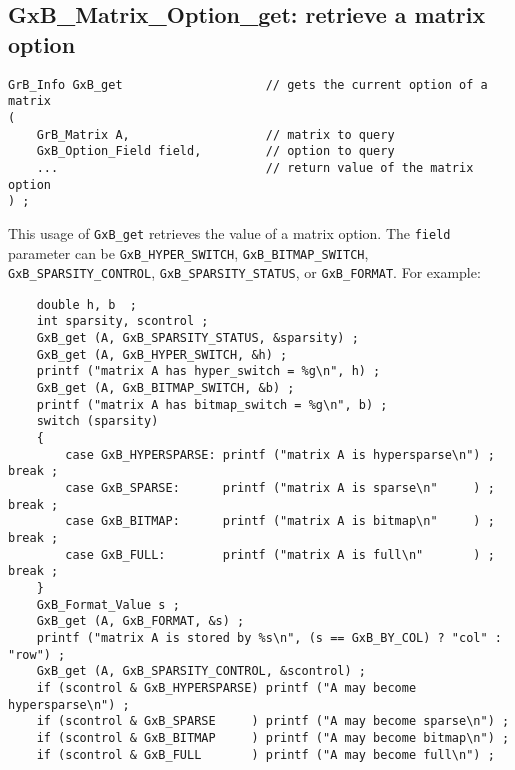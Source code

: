 \documentclass[12pt]{article}
\begin{document}
\subsection{{\sf GxB\_Matrix\_Option\_get:} retrieve a matrix option}

\begin{mdframed}[userdefinedwidth=6in]
{\footnotesize
\begin{verbatim}
GrB_Info GxB_get                    // gets the current option of a matrix
(
    GrB_Matrix A,                   // matrix to query
    GxB_Option_Field field,         // option to query
    ...                             // return value of the matrix option
) ;
\end{verbatim} } \end{mdframed}

This usage of \verb'GxB_get' retrieves the value of a matrix option.  The
\verb'field' parameter can be
\verb'GxB_HYPER_SWITCH',
\verb'GxB_BITMAP_SWITCH',
\verb'GxB_SPARSITY_CONTROL',
\verb'GxB_SPARSITY_STATUS',
or
\verb'GxB_FORMAT'.
For example:

\vspace{-0.1in}
{\footnotesize
\begin{verbatim}
    double h, b  ;
    int sparsity, scontrol ;
    GxB_get (A, GxB_SPARSITY_STATUS, &sparsity) ;
    GxB_get (A, GxB_HYPER_SWITCH, &h) ;
    printf ("matrix A has hyper_switch = %g\n", h) ;
    GxB_get (A, GxB_BITMAP_SWITCH, &b) ;
    printf ("matrix A has bitmap_switch = %g\n", b) ;
    switch (sparsity)
    {
        case GxB_HYPERSPARSE: printf ("matrix A is hypersparse\n") ; break ;
        case GxB_SPARSE:      printf ("matrix A is sparse\n"     ) ; break ;
        case GxB_BITMAP:      printf ("matrix A is bitmap\n"     ) ; break ;
        case GxB_FULL:        printf ("matrix A is full\n"       ) ; break ;
    }
    GxB_Format_Value s ;
    GxB_get (A, GxB_FORMAT, &s) ;
    printf ("matrix A is stored by %s\n", (s == GxB_BY_COL) ? "col" : "row") ;
    GxB_get (A, GxB_SPARSITY_CONTROL, &scontrol) ;
    if (scontrol & GxB_HYPERSPARSE) printf ("A may become hypersparse\n") ;
    if (scontrol & GxB_SPARSE     ) printf ("A may become sparse\n") ;
    if (scontrol & GxB_BITMAP     ) printf ("A may become bitmap\n") ;
    if (scontrol & GxB_FULL       ) printf ("A may become full\n") ; \end{verbatim} }
\end{document}

